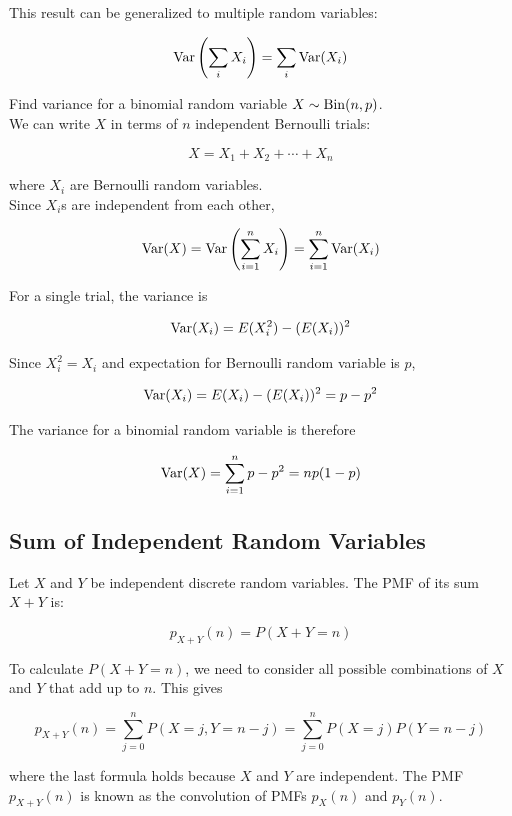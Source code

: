 This result can be generalized to multiple random variables:

\[\operatorname{Var}\left( \sum_i X_i \right) = \sum_i \operatorname{Var}(X_i)\]

\begin{texample}
	Find variance for a binomial random variable $X\sim\operatorname{Bin}(n,p)$. \\
	
	We can write $X$ in terms of $n$ independent Bernoulli trials:
	
	\[X=X_1+X_2+\cdots+X_n\]
	
	where $X_i$ are Bernoulli random variables. \\
	
	Since $X_i$s are independent from each other,
	
	\[\operatorname{Var}(X)=\operatorname{Var}\left( \sum_{i=1}^n X_i \right) = \sum_{i=1}^n \operatorname{Var}(X_i)\]
	
	For a single trial, the variance is
	
	\[\operatorname{Var}(X_i)=E(X_i^2)-(E(X_i))^2\]
	
	Since $X_i^2=X_i$ and expectation for Bernoulli random variable is $p$,
	
	\[\operatorname{Var}(X_i)=E(X_i)-(E(X_i))^2=p-p^2\]
	
	The variance for a binomial random variable is therefore
	
	\[\operatorname{Var}(X) = \sum_{i=1}^n p-p^2 = np(1-p)\]
\end{texample}

\subsection{Sum of Independent Random Variables}

Let $X$ and $Y$ be independent discrete random variables. The PMF of its sum $X+Y$ is:

\[p_{X+Y}(n)=P(X+Y=n)\]

To calculate $P(X+Y=n)$, we need to consider all possible combinations of $X$ and $Y$ that add up to $n$. This gives

\[p_{X+Y}(n)=\sum_{j=0}^n P(X=j,Y=n-j)=\sum_{j=0}^n P(X=j)P(Y=n-j)\]

where the last formula holds because $X$ and $Y$ are independent. The PMF $p_{X+Y}(n)$ is known as the convolution of PMFs $p_X(n)$ and $p_Y(n)$.

